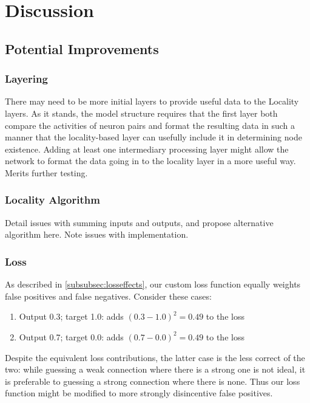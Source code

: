 \chapter{Discussion}

\section{Potential Improvements}

\subsection{Layering}
There may need to be more initial layers to provide useful data to the Locality 
layers.  As it stands, the model structure requires that the first layer both 
compare the activities of neuron pairs and format the resulting data in such a 
manner that the locality-based layer can usefully include it in determining node 
existence.  Adding at least one intermediary processing layer might allow the 
network to format the data going in to the locality layer in a more useful way.  
Merits further testing.

\subsection{Locality Algorithm}
Detail issues with summing inputs and outputs, and propose alternative algorithm 
here. Note issues with implementation.

\subsection{Loss}
As described in \ref{subsubsec:losseffects}, our custom loss function equally 
weights false positives and false negatives. Consider these cases:

\begin{enumerate}
	\item Output 0.3; target 1.0: adds $(0.3-1.0)^2=0.49$ to the loss
	\item Output 0.7; target 0.0: adds $(0.7-0.0)^2=0.49$ to the loss
\end{enumerate}
Despite the equivalent loss contributions, the latter case is the less correct 
of the two: while guessing a weak connection where there is a strong one is not 
ideal, it is preferable to guessing a strong connection where there is none.  
Thus our loss function might be modified to more strongly disincentive false 
positives.

